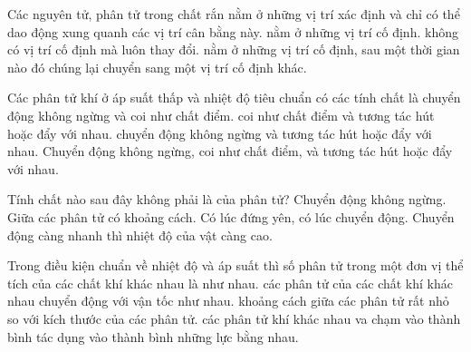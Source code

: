 \begin{ex}
Các nguyên tử, phân tử trong chất rắn
\choice
{\True nằm ở những vị trí xác định và chỉ có thể dao động xung quanh các vị trí cân bằng này.}
{nằm ở những vị trí cố định.}
{không có vị trí cố định mà luôn thay đổi.}
{nằm ở những vị trí cố định, sau một thời gian nào đó chúng lại chuyển sang một vị trí cố định khác.}
\end{ex}


\begin{ex}
Các phân tử khí ở áp suất thấp và nhiệt độ tiêu chuẩn có các tính chất là
\choice
{chuyển động không ngừng và coi như chất điểm.}
{coi như chất điểm và tương tác hút hoặc đẩy với nhau.}
{chuyển động không ngừng và tương tác hút hoặc đẩy với nhau.}
{\True Chuyển động không ngừng, coi như chất điểm, và tương tác hút hoặc đẩy với nhau.}
\end{ex}

\begin{ex}
Tính chất nào sau đây không phải là của phân tử?
\choice
{Chuyển động không ngừng.}
{Giữa các phân tử có khoảng cách.}
{\True Có lúc đứng yên, có lúc chuyển động.}
{Chuyển động càng nhanh thì nhiệt độ của vật càng cao.}
\end{ex}


\begin{ex}
Trong điều kiện chuẩn về nhiệt độ và áp suất thì
\choice
{\True số phân tử trong một đơn vị thể tích của các chất khí khác nhau là như nhau.}
{các phân tử của các chất khí khác nhau chuyển động với vận tốc như nhau.}
{khoảng cách giữa các phân tử rất nhỏ so với kích thước của các phân tử.}
{các phân tử khí khác nhau va chạm vào thành bình tác dụng vào thành bình những lực bằng nhau.}
\end{ex}

